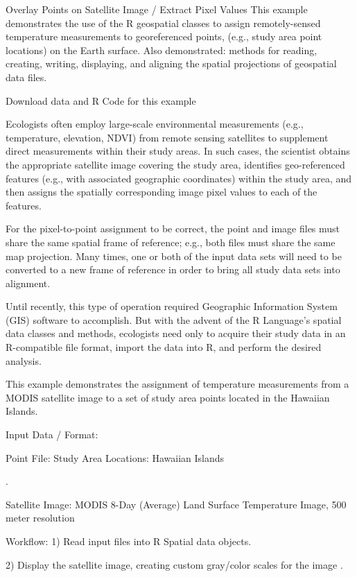 Overlay Points on Satellite Image / Extract Pixel Values
This example demonstrates the use of the R geospatial classes to assign remotely-sensed temperature measurements to georeferenced points, (e.g., study area point locations) on the Earth surface. Also demonstrated: methods for reading, creating, writing, displaying, and aligning the spatial projections of geospatial data files.

Download data and R Code for this example

Ecologists often employ large-scale environmental measurements (e.g., temperature, elevation, NDVI) from remote sensing satellites to supplement direct measurements within their study areas. In such cases, the scientist obtains the appropriate satellite image covering the study area, identifies geo-referenced features (e.g., with associated geographic coordinates) within the study area, and then assigns the spatially corresponding image pixel values to each of the features.

For the pixel-to-point assignment to be correct, the point and image files must share the same spatial frame of reference; e.g., both files must share the same map projection. Many times, one or both of the input data sets will need to be converted to a new frame of reference in order to bring all study data sets into alignment.

Until recently, this type of operation required Geographic Information System (GIS) software to accomplish. But with the advent of the R Language's spatial data classes and methods, ecologists need only to acquire their study data in an R-compatible file format, import the data into R, and perform the desired analysis.

This example demonstrates the assignment of temperature measurements from a MODIS satellite image to a set of study area points located in the Hawaiian Islands.

Input Data / Format:




Point File: Study Area Locations: Hawaiian Islands

.



Satellite Image: MODIS 8-Day (Average) Land Surface Temperature Image, 500 meter resolution

Workflow:
1) Read input files into R Spatial data objects.

2) Display the satellite image, creating custom gray/color scales for the image .

